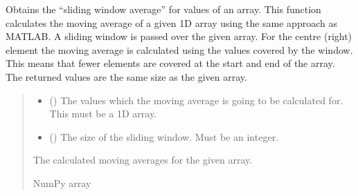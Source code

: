 \documentclass[letterpaper,10pt,english]{sphinxmanual}
\begin{document}

\begin{fulllineitems}
\label{\detokenize{modules/waypoints/generation:qnav.waypoints.generation.moving_average}}
\pysigstartsignatures
{}
\pysigstopsignatures
\sphinxAtStartPar
Obtains the “sliding window average” for values of an array.
This function calculates the moving average of a given 1D array using the
same approach as MATLAB. A sliding window is passed over the given array.
For the centre (right) element the moving average is calculated using the
values covered by the window. This means that fewer elements are covered
at the start and end of the array. The returned values are the same size
as the given array.
\begin{quote}\begin{description}
\begin{itemize}
\item {} 
\sphinxAtStartPar
{} () \textendash{} The values which the moving average is going to be
calculated for. This must be a 1D array.

\item {} 
\sphinxAtStartPar
{} () \textendash{} The size of the sliding window. Must be an integer.

\end{itemize}

\sphinxAtStartPar
The calculated moving averages for the given array.

\sphinxAtStartPar
NumPy array

\end{description}\end{quote}

\end{fulllineitems}

\end{document}
